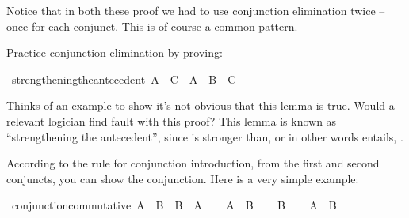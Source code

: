 \begin{isabellebody}
%
\begin{isamarkuptext}%
Notice that in both these proof we had to use conjunction elimination twice -- once for each
conjunct. This is of course a common pattern.%
\end{isamarkuptext}\isamarkuptrue%
%
\begin{isamarkuptext}%
\begin{Exercise}[title = Strengthening the Antecedent] Practice conjunction elimination by proving: \end{Exercise}%
\end{isamarkuptext}\isamarkuptrue%
\isamarkupfalse%
\ strengthening{\isacharunderscore}the{\isacharunderscore}antecedent{\isacharcolon}\ {\isachardoublequoteopen}{\isacharparenleft}A\ {\isasymlongrightarrow}\ C{\isacharparenright}\ {\isasymlongrightarrow}\ {\isacharparenleft}A\ {\isasymand}\ B\ {\isasymlongrightarrow}\ C{\isacharparenright}{\isachardoublequoteclose}%
\isadelimproof
\ %
\endisadelimproof
%
\isatagproof
{}\isamarkupfalse%
%
\endisatagproof
{\isafoldproof}%
%
\isadelimproof
%
\endisadelimproof
%
\begin{isamarkuptext}%
Thinks of an example to show it's not obvious that this lemma is true. Would a relevant logician
find fault with this proof? This lemma is known as ``strengthening the antecedent'', since 
is stronger than, or in other words entails, .%
\end{isamarkuptext}\isamarkuptrue%
%
\isamarkuptrue%
%
\begin{isamarkuptext}%
According to the rule for conjunction introduction, from the first and second conjuncts, you
can show the conjunction. Here is a very simple example:%
\end{isamarkuptext}\isamarkuptrue%
\isamarkupfalse%
\ conjunction{\isacharunderscore}commutative{\isacharcolon}\ {\isachardoublequoteopen}A\ {\isasymand}\ B\ {\isasymlongrightarrow}\ B\ {\isasymand}\ A{\isachardoublequoteclose}\isanewline
%
\isadelimproof
%
\endisadelimproof
%
\isatagproof
{}\isamarkupfalse%
\isanewline
\ \ \isamarkupfalse%
\ {\isachardoublequoteopen}A\ {\isasymand}\ B{\isachardoublequoteclose}\isanewline
\ \ \isamarkupfalse%
\ {\isachardoublequoteopen}B{\isachardoublequoteclose}\isacommand{{\isachardot}{\isachardot}}\isamarkupfalse%
\isanewline
\ \ \isamarkupfalse%
\ {\isacharbackquoteopen}A\ {\isasymand}\ B{\isacharbackquoteclose}\ \isamarkupfalse%

\end{isabellebody}
